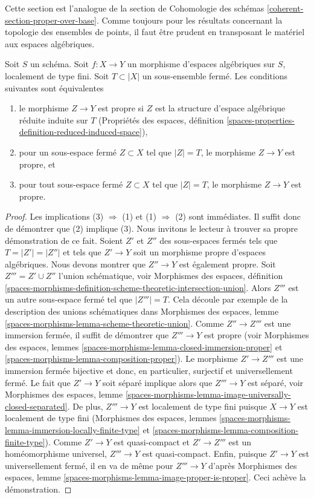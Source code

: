 \noindent
Cette section est l'analogue de la section de Cohomologie des schémas
\ref{coherent-section-proper-over-base}.
Comme toujours pour les résultats concernant la topologie des ensembles de points,
il faut être prudent en transposant le matériel aux espaces algébriques.

\begin{lemma}
\label{lemma-closed-proper-over-base}
Soit $S$ un schéma. Soit $f : X \to Y$ un morphisme d'espaces algébriques
sur $S$, localement de type fini. Soit $T \subset |X|$ un sous-ensemble fermé.
Les conditions suivantes sont équivalentes
\begin{enumerate}
\item le morphisme $Z \to Y$ est propre si $Z$ est la structure d'espace algébrique réduite
induite sur $T$
(Propriétés des espaces, définition
\ref{spaces-properties-definition-reduced-induced-space}),
\item pour un sous-espace fermé $Z \subset X$ tel que $|Z| = T$,
le morphisme $Z \to Y$ est propre, et
\item pour tout sous-espace fermé $Z \subset X$ tel que $|Z| = T$, le morphisme
$Z \to Y$ est propre.
\end{enumerate}
\end{lemma}

\begin{proof}
Les implications (3) $\Rightarrow$ (1) et (1) $\Rightarrow$ (2)
sont immédiates. Il suffit donc de démontrer que (2) implique (3).
Nous invitons le lecteur à trouver sa propre démonstration de ce fait.
Soient $Z'$ et $Z''$ des sous-espaces fermés tels que $T = |Z'| = |Z''|$
et tels que $Z' \to Y$ soit un morphisme propre d'espaces algébriques.
Nous devons montrer que $Z'' \to Y$ est également propre.
Soit $Z''' = Z' \cup Z''$ l'union schématique, voir
Morphismes des espaces, définition
\ref{spaces-morphisms-definition-scheme-theoretic-intersection-union}.
Alors $Z'''$ est un autre sous-espace fermé tel que $|Z'''| = T$.
Cela découle par exemple de la description des unions schématiques dans
Morphismes des espaces, lemme \ref{spaces-morphisms-lemma-scheme-theoretic-union}.
Comme $Z'' \to Z'''$ est une immersion fermée, il suffit de démontrer
que $Z''' \to Y$ est propre (voir
Morphismes des espaces, lemmes
\ref{spaces-morphisms-lemma-closed-immersion-proper} et
\ref{spaces-morphisms-lemma-composition-proper}).
Le morphisme $Z' \to Z'''$ est une immersion fermée bijective
et donc, en particulier, surjectif et universellement fermé.
Le fait que $Z' \to Y$ soit séparé implique alors que
$Z''' \to Y$ est séparé, voir
Morphismes des espaces, lemme
\ref{spaces-morphisms-lemma-image-universally-closed-separated}.
De plus, $Z''' \to Y$ est localement de type fini
puisque $X \to Y$ est localement de type fini
(Morphismes des espaces, lemmes
\ref{spaces-morphisms-lemma-immersion-locally-finite-type} et
\ref{spaces-morphisms-lemma-composition-finite-type}).
Comme $Z' \to Y$ est quasi-compact et $Z' \to Z'''$ est un
homéomorphisme universel, $Z''' \to Y$ est quasi-compact.
Enfin, puisque $Z' \to Y$ est universellement fermé,
il en va de même pour $Z''' \to Y$ d'après
Morphismes des espaces, lemme \ref{spaces-morphisms-lemma-image-proper-is-proper}.
Ceci achève la démonstration.
\end{proof}

